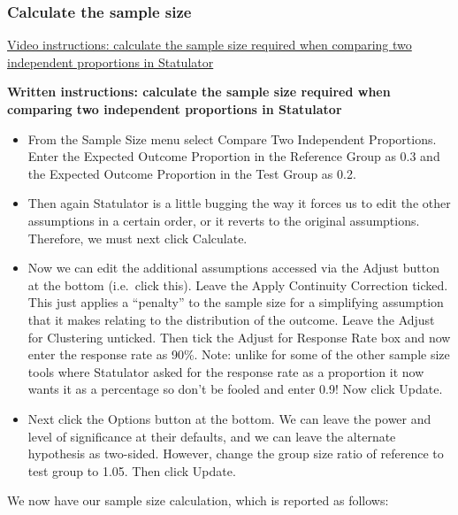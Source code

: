 \documentclass[
]{book}
\begin{document}
\hypertarget{calculate-the-sample-size-1}{%
\subsubsection{Calculate the sample size}\label{calculate-the-sample-size-1}}

\href{https://youtu.be/0XuRrBTpwnw}{Video instructions: calculate the sample size required when comparing two independent proportions in Statulator}

\textbf{Written instructions: calculate the sample size required when comparing two independent proportions in Statulator}

\begin{itemize}
\item
  From the Sample Size menu select Compare Two Independent Proportions. Enter the Expected Outcome Proportion in the Reference Group as 0.3 and the Expected Outcome Proportion in the Test Group as 0.2.
\item
  Then again Statulator is a little bugging the way it forces us to edit the other assumptions in a certain order, or it reverts to the original assumptions. Therefore, we must next click Calculate.
\item
  Now we can edit the additional assumptions accessed via the Adjust button at the bottom (i.e.~click this). Leave the Apply Continuity Correction ticked. This just applies a ``penalty'' to the sample size for a simplifying assumption that it makes relating to the distribution of the outcome. Leave the Adjust for Clustering unticked. Then tick the Adjust for Response Rate box and now enter the response rate as 90\%. Note: unlike for some of the other sample size tools where Statulator asked for the response rate as a proportion it now wants it as a percentage so don't be fooled and enter 0.9! Now click Update.
\item
  Next click the Options button at the bottom. We can leave the power and level of significance at their defaults, and we can leave the alternate hypothesis as two-sided. However, change the group size ratio of reference to test group to 1.05. Then click Update.
\end{itemize}

We now have our sample size calculation, which is reported as follows:
\end{document}
